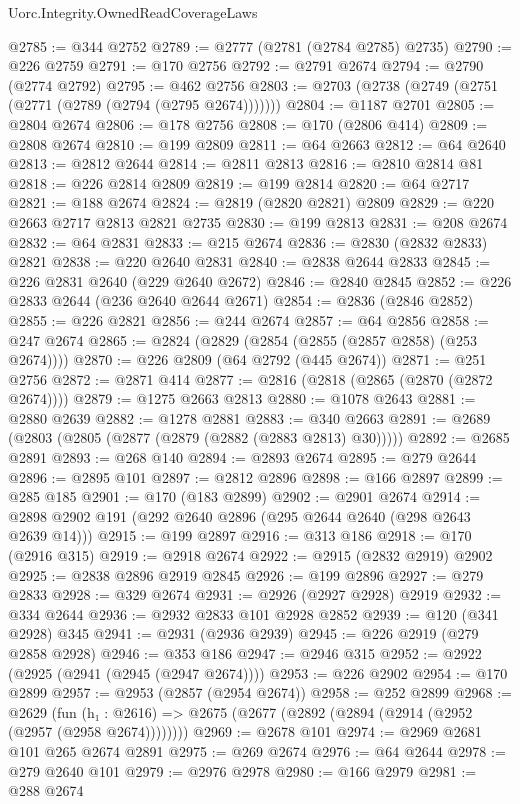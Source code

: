 \begin{lexlean}{Uorc.Integrity.OwnedReadCoverageLaws}
\begin{coremodule}
@2785 := @344 @2752
@2789 := @2777 (@2781 (@2784 @2785) @2735)
@2790 := @226 @2759
@2791 := @170 @2756
@2792 := @2791 @2674
@2794 := @2790 (@2774 @2792)
@2795 := @462 @2756
@2803 := @2703 (@2738 (@2749 (@2751 (@2771 (@2789 (@2794 (@2795 @2674)))))))
@2804 := @1187 @2701
@2805 := @2804 @2674
@2806 := @178 @2756
@2808 := @170 (@2806 @414)
@2809 := @2808 @2674
@2810 := @199 @2809
@2811 := @64 @2663
@2812 := @64 @2640
@2813 := @2812 @2644
@2814 := @2811 @2813
@2816 := @2810 @2814 @81
@2818 := @226 @2814 @2809
@2819 := @199 @2814
@2820 := @64 @2717
@2821 := @188 @2674
@2824 := @2819 (@2820 @2821) @2809
@2829 := @220 @2663 @2717 @2813 @2821 @2735
@2830 := @199 @2813
@2831 := @208 @2674
@2832 := @64 @2831
@2833 := @215 @2674
@2836 := @2830 (@2832 @2833) @2821
@2838 := @220 @2640 @2831
@2840 := @2838 @2644 @2833
@2845 := @226 @2831 @2640 (@229 @2640 @2672)
@2846 := @2840 @2845
@2852 := @226 @2833 @2644 (@236 @2640 @2644 @2671)
@2854 := @2836 (@2846 @2852)
@2855 := @226 @2821
@2856 := @244 @2674
@2857 := @64 @2856
@2858 := @247 @2674
@2865 := @2824 (@2829 (@2854 (@2855 (@2857 @2858) (@253 @2674))))
@2870 := @226 @2809 (@64 @2792 (@445 @2674))
@2871 := @251 @2756
@2872 := @2871 @414
@2877 := @2816 (@2818 (@2865 (@2870 (@2872 @2674))))
@2879 := @1275 @2663 @2813
@2880 := @1078 @2643
@2881 := @2880 @2639
@2882 := @1278 @2881
@2883 := @340 @2663
@2891 := @2689 (@2803 (@2805 (@2877 (@2879 (@2882 (@2883 @2813) @30)))))
@2892 := @2685 @2891
@2893 := @268 @140
@2894 := @2893 @2674
@2895 := @279 @2644
@2896 := @2895 @101
@2897 := @2812 @2896
@2898 := @166 @2897
@2899 := @285 @185
@2901 := @170 (@183 @2899)
@2902 := @2901 @2674
@2914 := @2898 @2902 @191 (@292 @2640 @2896 (@295 @2644 @2640 (@298 @2643 @2639 @14)))
@2915 := @199 @2897
@2916 := @313 @186
@2918 := @170 (@2916 @315)
@2919 := @2918 @2674
@2922 := @2915 (@2832 @2919) @2902
@2925 := @2838 @2896 @2919 @2845
@2926 := @199 @2896
@2927 := @279 @2833
@2928 := @329 @2674
@2931 := @2926 (@2927 @2928) @2919
@2932 := @334 @2644
@2936 := @2932 @2833 @101 @2928 @2852
@2939 := @120 (@341 @2928) @345
@2941 := @2931 (@2936 @2939)
@2945 := @226 @2919 (@279 @2858 @2928)
@2946 := @353 @186
@2947 := @2946 @315
@2952 := @2922 (@2925 (@2941 (@2945 (@2947 @2674))))
@2953 := @226 @2902
@2954 := @170 @2899
@2957 := @2953 (@2857 (@2954 @2674))
@2958 := @252 @2899
@2968 := @2629
    (fun (h₁ : @2616) => @2675 (@2677 (@2892 (@2894 (@2914 (@2952 (@2957 (@2958 @2674))))))))
@2969 := @2678 @101
@2974 := @2969 @2681 @101 @265 @2674 @2891
@2975 := @269 @2674
@2976 := @64 @2644
@2978 := @279 @2640 @101
@2979 := @2976 @2978
@2980 := @166 @2979
@2981 := @288 @2674

\end{coremodule}
\end{lexlean}
